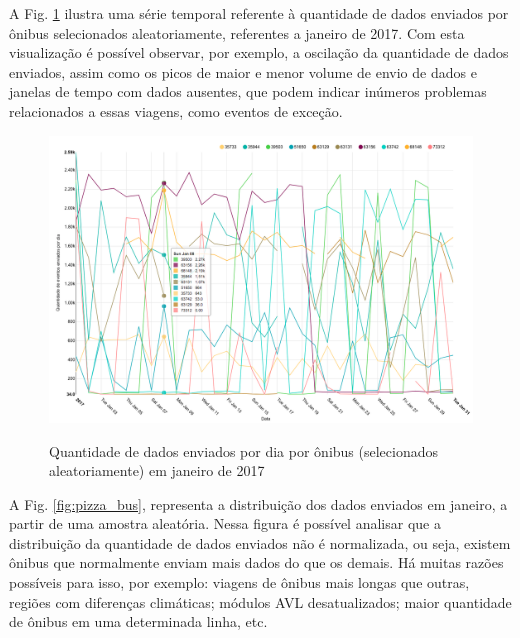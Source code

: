 \documentclass[
	12pt,				%
	oneside,			%
	a4paper,			%
	english,			%
	brazil				%
	]{abntex2ppgsi}
\begin{document}
{{A Fig. \ref {fig:analysis_by_bus_lines} ilustra uma série temporal referente à quantidade de dados enviados por ônibus selecionados aleatoriamente, referentes a janeiro de 2017. Com esta visualização é possível observar, por exemplo, a oscilação da quantidade de dados enviados, assim como os picos de maior e menor volume de envio de dados e janelas de tempo com dados ausentes, que podem indicar inúmeros problemas relacionados a essas viagens, como eventos de exceção.

\begin{figure}[!htb]%
	\centering
 	  \caption{Quantidade de dados enviados por dia  por ônibus (selecionados aleatoriamente) em janeiro de 2017}
		\includegraphics[width=1\linewidth]{images/analysis_by_bus_lines_pt.png}
	\label{fig:analysis_by_bus_lines}
\end{figure}

A Fig. \ref{fig:pizza_bus}, representa a distribuição dos dados enviados em janeiro, a partir de uma amostra aleatória. Nessa figura é possível analisar que a distribuição da quantidade de dados enviados não é normalizada, ou seja, existem ônibus que normalmente enviam mais dados do que os demais. Há muitas razões possíveis para isso, por exemplo: viagens de ônibus mais longas que outras, regiões com diferenças climáticas; módulos AVL desatualizados; maior quantidade de ônibus em uma determinada linha, etc.

}}
\end{document}
